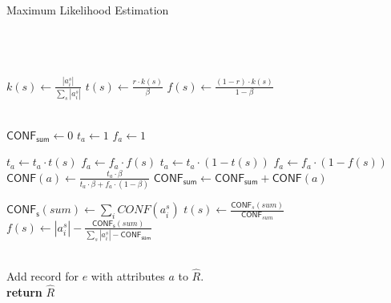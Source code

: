 \documentclass{acm_proc_article-sp}
\begin{document}
\clearpage
\begin{algorithm}
\caption{Maximum Likelihood Estimation}
\begin{algorithmic}[1]
\small
{} \\
 \\
 \\


\State $ k(s) \leftarrow \frac{|a_i^s|}{\sum_s|a_i^s|} $
\State $ t(s) \leftarrow \frac{r  \cdot k(s)}{\beta} $
\State $ f(s) \leftarrow \frac{(1-r) \cdot k(s)}{1-\beta} $
\EndFor

\\
\State $\mathsf{CONF_{sum}} \leftarrow 0 $
\State $ t_a \leftarrow 1 $
\State $ f_a \leftarrow 1 $

\State $ t_a \leftarrow t_a  \cdot t(s) $
\State $ f_a \leftarrow f_a   \cdot f(s) $
\Else
\State $ t_a \leftarrow t_a  \cdot (1-t(s)) $
\State $ f_a \leftarrow f_a   \cdot (1-f(s)) $
\EndIf
\EndFor
\State $ \mathsf{CONF}(a) \leftarrow \frac{t_a \cdot \beta}{t_a \cdot \beta + f_a \cdot (1-\beta)} $
\State $\mathsf{CONF_{sum}} \leftarrow \mathsf{CONF_{sum}} + \mathsf{CONF}(a) $
\EndFor
\EndFor

\State $\mathsf{CONF_s}(sum) \leftarrow \sum_i CONF(a_i^s)  $
\State $ t(s) \leftarrow \frac{\mathsf{CONF}_s(sum)}{\mathsf{CONF}_{sum}}  $
\State $ f(s) \leftarrow  |a_i^s| - \frac{\mathsf{CONF_s}(sum)}{\sum_s|a_i^s| - \mathsf{CONF_{sum}}}  $
\EndFor


\EndWhile

\\

  \State Add record for $e$ with attributes $a$ to $\hat{R}$.
\EndIf
\EndFor
\EndFor
\\

\State \textbf{return} $\hat{R}$
\EndFunction
\end{algorithmic}
\label{alg:ml}
\end{algorithm}  
\end{document}
